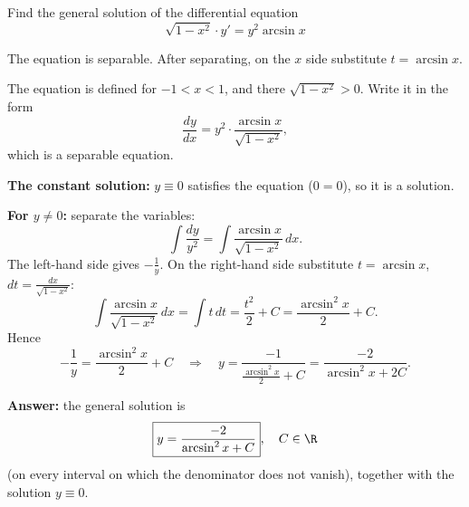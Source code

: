 
\begin{question}
Find the general solution of the differential equation
\[ \sqrt{1 - x^2} \cdot y' = y^2 \arcsin x \]
\end{question}

\begin{hint}
The equation is separable. After separating, on the $x$ side substitute $t = \arcsin x$.
\end{hint}

\begin{solution}
The equation is defined for $-1 < x < 1$, and there $\sqrt{1 - x^2} > 0$. Write it in the form
\[ \frac{dy}{dx} = y^2 \cdot \frac{\arcsin x}{\sqrt{1 - x^2}}, \]
which is a separable equation.

\textbf{The constant solution:} $y \equiv 0$ satisfies the equation ($0 = 0$), so it is a solution.

\textbf{For $y \ne 0$:} separate the variables:
\[ \int \frac{dy}{y^2} = \int \frac{\arcsin x}{\sqrt{1 - x^2}}\,dx. \]
The left-hand side gives $-\frac{1}{y}$. On the right-hand side substitute $t = \arcsin x$, $dt = \frac{dx}{\sqrt{1 - x^2}}$:
\[ \int \frac{\arcsin x}{\sqrt{1 - x^2}}\,dx = \int t\,dt = \frac{t^2}{2} + C = \frac{\arcsin^2 x}{2} + C. \]
Hence
\[ -\frac{1}{y} = \frac{\arcsin^2 x}{2} + C \quad\Longrightarrow\quad y = \frac{-1}{\frac{\arcsin^2 x}{2} + C} = \frac{-2}{\arcsin^2 x + 2C}. \]

\textbf{Answer:} the general solution is
\[ \boxed{y = \frac{-2}{\arcsin^2 x + C}}, \quad C \in \R \]
(on every interval on which the denominator does not vanish), together with the solution $y \equiv 0$.
\end{solution}
